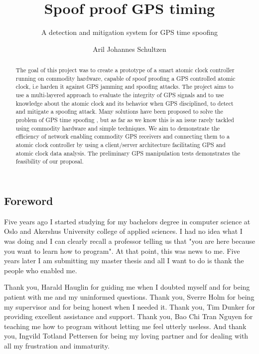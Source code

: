 \documentclass[12pt,english,a4paper]{report}
\title{Spoof proof GPS timing}
\subtitle{A detection and mitigation system for GPS time spoofing}
\author{Aril Johannes Schultzen}
\begin{document}
\duoforside[dept={Spoof proof GPS timing},
program={Informatikk: programmering og nettverk},
long]

\subsection*{Foreword}
Five years ago I started studying for my bachelors degree in computer science at Oslo and Akershus University college of applied sciences. I had no idea what I was doing and I can clearly recall a professor telling us that "you are here because you want to learn how to program". At that point, this was news to me. Five years later I am submitting my master thesis and all I want to do is thank the people who enabled me.

Thank you, Harald Hauglin for guiding me when I doubted myself and for being patient with me and my uninformed questions. Thank you, Sverre Holm for being my supervisor and for being honest when I needed it. Thank you, Tim Dunker for providing excellent assistance and support. Thank you, Bao Chi Tran Nguyen for teaching me how to program without letting me feel utterly useless. And thank you, Ingvild Totland Pettersen for being my loving partner and for dealing with all my frustration and immaturity.

\begin{abstract}
The goal of this project was to create a prototype of a smart atomic clock controller running on commodity hardware, capable of spoof proofing a GPS controlled atomic clock, i.e harden it against GPS jamming and spoofing attacks. The project aims to use a multi-layered approach to evaluate the integrity of GPS signals and to use knowledge about the atomic clock and its behavior when GPS disciplined, to detect and mitigate a spoofing attack. Many solutions have been proposed to solve the problem of GPS time spoofing \cite{HengChouGao14}, but as far as we know this is an issue rarely tackled using commodity hardware and simple techniques. We aim to demonstrate the efficiency of network enabling commodity GPS receivers and connecting them to a atomic clock controller by using a client/server architecture facilitating GPS and atomic clock data analysis. The preliminary GPS manipulation tests demonstrates the feasibility of our proposal. 
\end{abstract}


\thispagestyle{empty}
\setcounter{page}{0}
\tableofcontents
\thispagestyle{empty}
\setcounter{page}{0}
\thispagestyle{empty}
\setcounter{page}{0}
\clearpage
\setcounter{page}{1}
\end{document}
